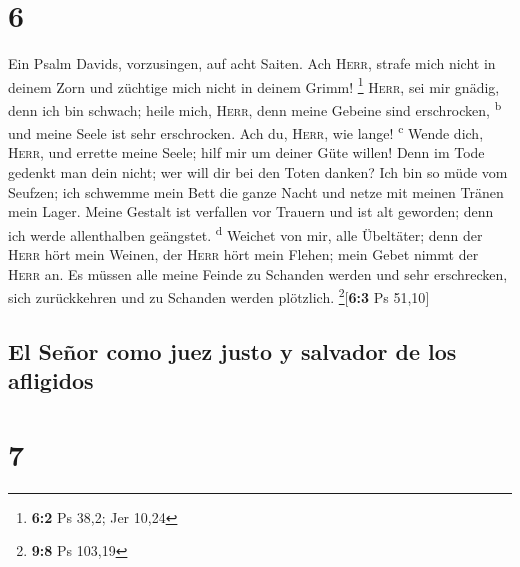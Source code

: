 \hypertarget{section-5}{%
\section{6}\label{section-5}}

 Ein Psalm Davids, vorzusingen, auf acht Saiten.
 Ach \textsc{Herr}, strafe mich nicht in deinem Zorn und
züchtige mich nicht in deinem Grimm! \footnote{\textbf{6:2} Ps 38,2; Jer
  10,24}  \textsc{Herr}, sei mir gnädig, denn ich bin
schwach; heile mich, \textsc{Herr}, denn meine Gebeine sind erschrocken,
\textsuperscript{b}  und meine Seele ist sehr erschrocken.
Ach du, \textsc{Herr}, wie lange! \textsuperscript{c} 
Wende dich, \textsc{Herr}, und errette meine Seele; hilf mir um deiner
Güte willen!  Denn im Tode gedenkt man dein nicht; wer
will dir bei den Toten danken?  Ich bin so müde vom
Seufzen; ich schwemme mein Bett die ganze Nacht und netze mit meinen
Tränen mein Lager.  Meine Gestalt ist verfallen vor
Trauern und ist alt geworden; denn ich werde allenthalben geängstet.
\textsuperscript{d}  Weichet von mir, alle Übeltäter; denn
der \textsc{Herr} hört mein Weinen,  der \textsc{Herr}
hört mein Flehen; mein Gebet nimmt der \textsc{Herr} an. 
Es müssen alle meine Feinde zu Schanden werden und sehr erschrecken,
sich zurückkehren und zu Schanden werden plötzlich.
\footnote{\textbf{9:8} Ps 103,19}{[}\textbf{6:3} Ps 51,10{]}

\hypertarget{el-seuxf1or-como-juez-justo-y-salvador-de-los-afligidos}{%
\subsection{El Señor como juez justo y salvador de los
afligidos}\label{el-seuxf1or-como-juez-justo-y-salvador-de-los-afligidos}}

\hypertarget{section-6}{%
\section{7}\label{section-6}}

